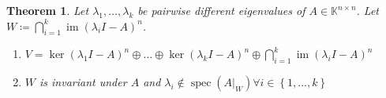 \documentclass[a4paper]{article}
\newcounter{lecref}[section]
\numberwithin{lecref}{section}
\newtheorem{theorem}[lecref]{Theorem}
\newtheorem*{Remark}{Remark}
\newcommand{\set}[1]{\left\{#1\right\}}
\DeclareMathOperator{\im}{im}
\begin{document}
\begin{theorem} %
  Let $\lambda_1, \dots, \lambda_k$ be pairwise different eigenvalues of $A \in \mathbb K^{n\times n}$.
  Let $W \coloneqq \bigcap_{i=1}^k \im(\lambda_i I - A)^n$.
  \begin{enumerate}
    \item $V = \ker(\lambda_1 I - A)^{n} \oplus \dots \oplus \ker(\lambda_k I - A)^n \oplus \bigcap_{i=1}^k \im(\lambda_i I - A)^n$
    \item $W$ is invariant under $A$ and $\lambda_i \not\in \operatorname{spec}(A|_W) \forall i \in \set{1, \dots, k}$
  \end{enumerate}
\end{theorem}

\end{document}
